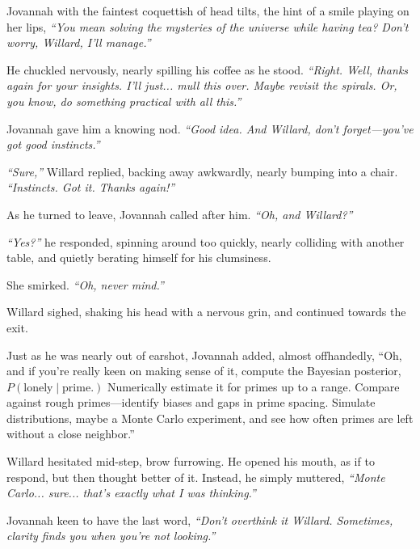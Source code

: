 Jovannah with the faintest coquettish of head tilts, the hint of a smile playing on her lips, \textit{“You mean solving the mysteries of the universe while having tea? Don’t worry, Willard, I’ll manage.”}
\bigskip

He chuckled nervously, nearly spilling his coffee as he stood. \textit{“Right. Well, thanks again for your insights. I’ll just... mull this over. Maybe revisit the spirals. Or, you know, do something practical with all this.”}
\bigskip

Jovannah gave him a knowing nod. \textit{“Good idea. And Willard, don’t forget—you’ve got good instincts.”}
\bigskip

\textit{“Sure,”} Willard replied, backing away awkwardly, nearly bumping into a chair. \textit{“Instincts. Got it. Thanks again!”}
\bigskip

As he turned to leave, Jovannah called after him. \textit{“Oh, and Willard?”}
\bigskip

\textit{“Yes?”} he responded, spinning around too quickly, nearly colliding with another table, and quietly berating himself for his clumsiness.

She smirked. \textit{“Oh, never mind.”} 

Willard sighed, shaking his head with a nervous grin, and continued towards the exit. 

Just as he was nearly out of earshot, Jovannah added, almost offhandedly, “Oh, and if you’re really keen on making sense of it, compute the Bayesian posterior, 
\(
P(\text{lonely} \mid \text{prime}.)
\)
Numerically estimate it for primes up to a range. Compare against rough primes—identify biases and gaps in prime spacing. Simulate distributions, maybe a Monte Carlo experiment, and see how often primes are left without a close neighbor.”
\bigskip

Willard hesitated mid-step, brow furrowing. He opened his mouth, as if to respond, but then thought better of it. Instead, he simply muttered, \textit{“Monte Carlo... sure... that’s exactly what I was thinking.”} 

\bigskip

Jovannah keen to have the last word, \textit{“Don’t overthink it Willard. Sometimes, clarity finds you when you’re not looking.”}
\bigskip

